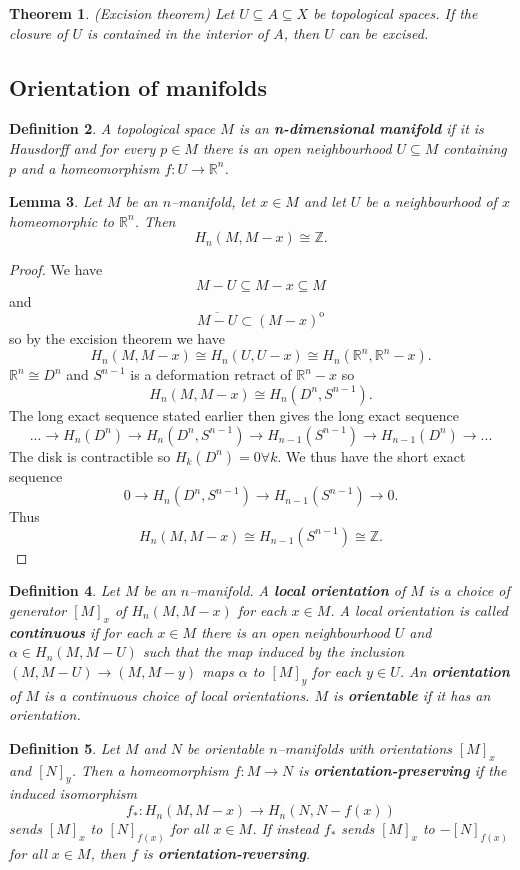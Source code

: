 \documentclass{article}
\newtheorem{theorem}{Theorem}[section]
\newtheorem{definition}[theorem]{Definition}
\newtheorem{lemma}[theorem]{Lemma}
\begin{document}
\begin{theorem}
(Excision theorem) Let $U\subseteq A\subseteq X$ be topological spaces. If the closure of $U$ is contained in the interior of $A$, then $U$ can be excised.
\end{theorem}
\subsection{Orientation of manifolds}
\begin{definition}
A topological space $M$ is an \textbf{n-dimensional manifold} if it is Hausdorff and for every $p\in M$ there is an open neighbourhood $U\subseteq M$ containing $p$ and a homeomorphism $f\colon U\to \mathbb{R}^n$.
\end{definition}
\begin{lemma}
Let $M$ be an $n$--manifold, let $x\in M$ and let $U$ be a neighbourhood of $x$ homeomorphic to $\mathbb{R}^n$. Then \[H_n(M,M-x)\cong\mathbb{Z}.\]
\end{lemma}
\begin{proof}
We have \[M-U\subseteq M-x\subseteq M\] and \[\overline{M-U}\subset(M-x)^{\mathrm{o}}\] so by the excision theorem we have \[H_n(M,M-x)\cong H_n(U,U-x)\cong H_n(\mathbb{R}^n,\mathbb{R}^n-x).\] $\mathbb{R}^n\cong D^n$ and $S^{n-1}$ is a deformation retract of $\mathbb{R}^n-x$ so \[H_n(M,M-x)\cong H_n(D^n,S^{n-1}).\] The long exact sequence stated earlier then gives the long exact sequence \[...\to H_n(D^n)\to H_n(D^n,S^{n-1})\to H_{n-1}(S^{n-1})\to H_{n-1}(D^n)\to...\] The disk is contractible so $H_k(D^n)=0\forall k$. We thus have the short exact sequence \[0\to H_n(D^n,S^{n-1})\to H_{n-1}(S^{n-1})\to 0.\] Thus \[H_n(M,M-x)\cong H_{n-1}(S^{n-1})\cong\mathbb{Z}.\]
\end{proof}

\begin{definition}
Let $M$ be an $n$--manifold. A \textbf{local orientation} of $M$ is a choice of generator $[M]_x$ of $H_n(M,M-x)$ for each $x\in M$. A local orientation is called \textbf{continuous} if for each $x\in M$ there is an open neighbourhood $U$ and $\alpha\in H_n(M,M-U)$ such that the map induced by the inclusion $(M,M-U)\to(M,M-y)$ maps $\alpha$ to $[M]_y$ for each $y\in U$. An \textbf{orientation} of $M$ is a continuous choice of local orientations. $M$ is \textbf{orientable} if it has an orientation.
\end{definition}

\begin{definition}
Let $M$ and $N$ be orientable $n$--manifolds with orientations $[M]_x$ and $[N]_y$. Then a homeomorphism $f:M\to N$ is \textbf{orientation-preserving} if the induced isomorphism \[f_*:H_n(M,M-x)\to H_n(N,N-f(x))\] sends $[M]_x$ to $[N]_{f(x)}$ for all $x\in M$. If instead $f_*$ sends $[M]_x$ to $-[N]_{f(x)}$ for all $x\in M$, then $f$ is \textbf{orientation-reversing}.
\end{definition}
\end{document}
